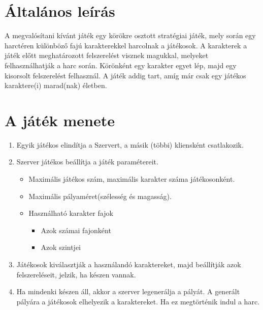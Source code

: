 \section{Általános leírás}
A megvalósítani kívánt játék egy körökre osztott stratégiai játék, mely során egy harctéren különböző fajú karakterekkel harcolnak a játékosok.
A karakterek a játék előtt meghatározott felszerelést visznek magukkal, melyeket felhasználhatják a harc során. Körönként egy karakter egyet lép, majd egy kisorsolt felszerelést felhasznál. A játék addig tart, amíg már csak egy játékos karaktere(i) marad(nak) életben.


\section{A játék menete}
\begin{enumerate}
	\item Egyik játékos elindítja a Szervert, a másik (többi) kliensként csatlakozik.
	\item Szerver játékos beállítja a játék paramétereit.
	\begin{itemize}\label{StartParams}
		\item Maximális játékos szám, maximális karakter száma játékosonként.
		\item Maximális pályaméret(szélesség és magasság).
		\item Használható karakter fajok
		\begin{itemize}
			\item Azok számai fajonként
			\item Azok szintjei
		\end{itemize}
	\end{itemize}
	\item Játékosok kiválasztják a használandó karaktereket, majd beállítják azok felszereléseit, jelzik, ha készen vannak.
	\item Ha mindenki készen áll, akkor a szerver legenerálja a pályát. A generált pályára a játékosok elhelyezik a karaktereket. Ha ez megtörténik indul a harc.
\end{enumerate}


